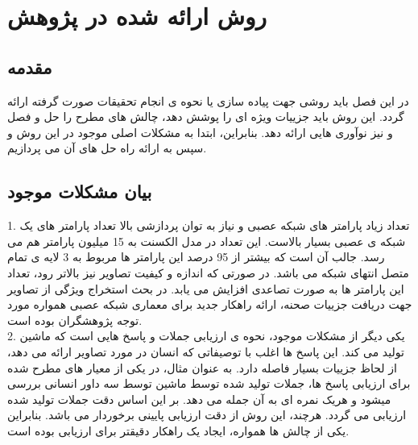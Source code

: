 \chapter{روش ارائه شده در پژوهش}

\section{مقدمه}
در این فصل باید روشی جهت پیاده سازی یا نحوه ی انجام تحقیقات صورت گرفته ارائه گردد. این روش باید جزییات ویژه ای را پوشش دهد، چالش های مطرح را حل و فصل و نیز نوآوری هایی ارائه دهد. بنابراین، ابتدا به مشکلات اصلی موجود در این روش و سپس به ارائه راه حل های آن می پردازیم.

\section{بیان مشکلات موجود}
1. تعداد زیاد پارامتر های شبکه عصبی و نیاز به توان پردازشی بالا
تعداد پارامتر های یک شبکه ی عصبی بسیار بالاست. این تعداد در مدل  الکسنت به 15 میلیون پارامتر هم می رسد. جالب آن است که بیشتر از 95 درصد این پارامتر ها مربوط به 3 لایه ی تمام متصل انتهای شبکه می باشد. در صورتی که اندازه و کیفیت تصاویر نیز بالاتر رود، تعداد این پارامتر ها به صورت تصاعدی افزایش می یابد. در بحث استخراج ویژگی از تصاویر جهت دریافت جزییات صحنه، ارائه راهکار جدید برای معماری شبکه عصبی همواره مورد توجه پژوهشگران بوده است.\\
2. یکی دیگر از مشکلات موجود، نحوه ی ارزیابی جملات و پاسخ هایی است که ماشین تولید می کند. این پاسخ ها اغلب با توصیفاتی که انسان در مورد تصاویر ارائه می دهد، از لحاظ جزییات بسیار فاصله دارد. به عنوان مثال، در یکی از معیار های مطرح شده برای ارزیابی پاسخ ها، جملات تولید شده توسط ماشین توسط سه داور انسانی بررسی میشود و هریک نمره ای به آن جمله می دهد. بر این اساس دقت جملات تولید شده ارزیابی می گردد. هرچند، این روش از دقت ارزیابی پایینی برخوردار می باشد. بنابراین یکی از چالش ها همواره، ایجاد یک راهکار دقیقتر برای ارزیابی بوده است.